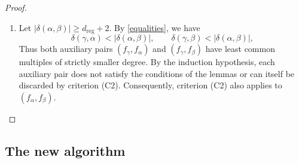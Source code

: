 \documentclass[a4paper, 12pt, oneside, openright]{article}
\begin{document}
\begin{proof}
\begin{enumerate}
Let $|\alpha|<d_{\mathrm{reg}}$, applying the construction of Lemma~\ref{lem:redundantNOfield} to $(f_\gamma,f_\alpha)$, we obtain a tuple $\gamma'$, where $|\gamma'|=d_{\mathrm{reg}}$ and
\[
\delta(\gamma,\gamma')=d_{\mathrm{reg}}+1,
\qquad
\delta(\gamma',\alpha)=d_{\mathrm{reg}}.
\]
Both auxiliary pairs $(f_{\gamma'},f_\gamma)$ and $(f_{\gamma'},f_\alpha)$ do not satisfy the conditions of the lemmas. Thus, (C2) allows  to discard $(f_\gamma,f_\alpha)$, and consequently $(f_\alpha,f_\beta)$.

Assume now $f_\alpha=x_j^q-x_j$ is a field polynomial. Since $|\delta(\alpha,\beta)|=d_{\mathrm{reg}}+1$, condition (i) of Lemma~\ref{lem:redundantField} cannot hold. 
Thus the pair must satisfy condition (ii), and hence $|\beta|<d_{\mathrm{reg}}$. The construction of $\gamma$ in Lemma~\ref{lem:redundantField} gives $\gamma_j=q-1$, and $|\gamma|=d_{\mathrm{reg}}$, and $\delta(\gamma,\alpha)=d_{\mathrm{reg}}+1$.
Hence $(f_\gamma,f_\alpha)$ does not satisfy the conditions of the lemmas. Moreover, $\delta(\gamma,\beta)=d_{\mathrm{reg}}$ by \eqref{equalities}. So, $(f_\gamma,f_\beta)$ does not satisfy the conditions of the lemmas.
\item Let $|\delta(\alpha,\beta)|\geq d_{\mathrm{reg}}+2$. By  \eqref{equalities}, we have
\[
\delta(\gamma,\alpha)<|\delta(\alpha,\beta)|,
\qquad
\delta(\gamma,\beta)<|\delta(\alpha,\beta)|,
\]
Thus both auxiliary pairs $(f_\gamma,f_\alpha)$ and $(f_\gamma,f_\beta)$ have least common multiples of strictly smaller degree. By the induction hypothesis, each auxiliary pair does not satisfy the conditions of the lemmas or can itself be discarded by criterion (C2). Consequently, criterion (C2) also applies to $(f_\alpha,f_\beta)$.

\end{enumerate}
\end{proof}
 



\subsection{The new algorithm}\label{sec:alg}
\end{document}
